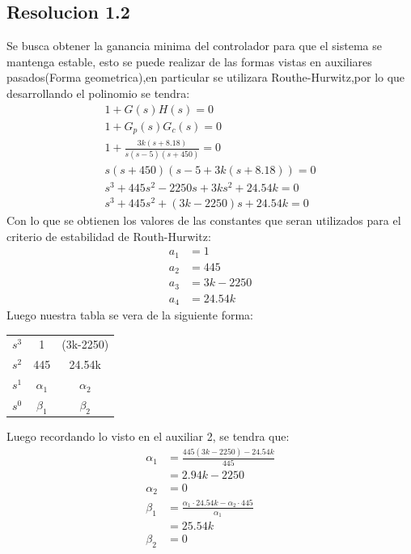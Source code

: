 \documentclass[
  11pt,
  letterpaper,
   addpoints,
   answers
  ]{exam}
\begin{document}
\begin{questions}
\begin{solution}
\subsection*{Resolucion 1.2}
Se busca obtener la ganancia minima del controlador para que el sistema se mantenga estable, esto se puede realizar de las formas vistas en auxiliares pasados(Forma geometrica),en particular se utilizara Routhe-Hurwitz,por lo que desarrollando el polinomio se tendra:
\begin{align}
    1+G(s)H(s) = 0\\
    1+G_{p}(s)G_{c}(s) = 0\\
    1+\frac{3k(s+8.18)}{s(s-5)(s+450)} = 0\\
    s(s+450)(s-5 + 3k(s+8.18)) = 0\\
    s^{3} + 445s^{2} - 2250s + 3ks^{2} + 24.54k = 0\\
    s^{3} + 445s^{2} + (3k-2250)s + 24.54k = 0
\end{align}
Con lo que se obtienen los valores de las constantes que seran utilizados para el criterio de estabilidad de Routh-Hurwitz:
\begin{align}
    a_{1} &= 1\\
    a_{2} &= 445\\
    a_{3} &= 3k-2250\\
    a_{4} &= 24.54k
\end{align}
Luego nuestra tabla se vera de la siguiente forma:
\begin{center}
    \begin{tabular}{|c|c|c|}
        \hline
        $s^{3}$ & 1 & (3k-2250)\\
        $s^{2}$ & 445 & 24.54k\\
        $s^{1}$ & $\alpha_{1}$ & $\alpha_{2}$\\
        $s^{0}$ & $\beta_{1}$ & $\beta_{2}$\\
        \hline
    \end{tabular}
\end{center}
Luego recordando lo visto en el auxiliar 2, se tendra que:
\begin{align}
    \alpha_{1} &= \frac{445(3k-2250) - 24.54k}{445}\\
               &= 2.94k - 2250\\
    \alpha_{2} &= 0\\
    \beta_{1}  &= \frac{\alpha_{1} \cdot 24.54k - \alpha_{2}\cdot 445}{\alpha_{1}}\\
               &= 25.54k\\
    \beta_{2}  &=0

\end{align}
\end{solution}
\end{questions}
\end{document}
